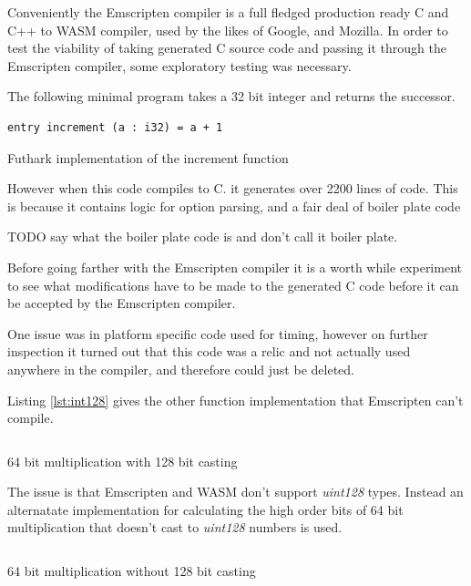 \documentclass[11pt]{book}
\begin{document}
Conveniently the Emscripten compiler is a full fledged production ready C and C++ to WASM compiler, used by the likes of Google, and Mozilla. In order to test the viability of taking generated C source code and passing it through the Emscripten compiler, some exploratory testing was necessary.

The following minimal program takes a 32 bit integer and returns the successor.
\begin{listing}[H]
\begin{verbatim}
entry increment (a : i32) = a + 1
\end{verbatim}
\caption{Futhark implementation of the increment function}
\label{lst:simp}
\end{listing}



However when this code compiles to C. it generates over 2200 lines of code. This is because it contains logic for option parsing, and a fair deal of boiler plate code

TODO say what the boiler plate code is and don't call it boiler plate.


Before going farther with the Emscripten compiler it is a worth while experiment to see what modifications have to be made to the generated C code before it can be accepted by the Emscripten compiler.

One issue was in platform specific code used for timing, however on further inspection it turned out that this code was a relic and not actually used anywhere in the compiler, and therefore could just be deleted.

Listing \ref{lst:int128} gives the other function implementation that Emscripten can't compile.
\begin{listing}[H] 
        \inputminted[fontsize=\small,baselinestretch=0.5,linenos]{C}{code/compiler/int128_c.c}
        \caption{64 bit multiplication with 128 bit casting}
        \label{lst:int128}    
\end{listing} 

The issue is that Emscripten and WASM don't support \textit{uint128} types. Instead an alternatate implementation for calculating the high order bits of 64 bit multiplication that doesn't cast to \textit{uint128} numbers is used. 

\begin{listing}[H] 
        \inputminted[fontsize=\small,baselinestretch=0.5,linenos]{C}{code/compiler/int128_wasm.c}
        \caption{64 bit multiplication without 128 bit casting}
        \label{lst:integrate-js}    
\end{listing} 
\end{document}
